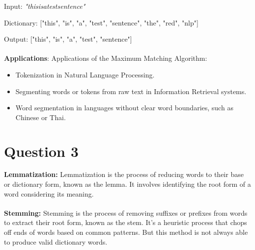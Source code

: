 \documentclass{article}
\begin{document}
Input: \textit{"thisisatestsentence"}

Dictionary: ["this", "is", "a", "test", "sentence", "the", "red", "nlp"]

Output: ["this", "is", "a", "test", "sentence"]\\\\

\textbf{Applications}: Applications of the Maximum Matching Algorithm:
\begin{itemize}
  \item Tokenization in Natural Language Processing.
  \item Segmenting words or tokens from raw text in Information Retrieval systems.
  \item Word segmentation in languages without clear word boundaries, such as Chinese or Thai.
\end{itemize}

\pagebreak

\section{Question 3}
\textbf{Lemmatization:} Lemmatization is the process of reducing words to their base or dictionary form, known as the lemma. It involves identifying the root form of a word considering its meaning. \\\\


\textbf{Stemming:} Stemming is the process of removing suffixes or prefixes from words to extract their root form, known as the stem. It's a heuristic process that chops off ends of words based on common patterns. But this method is not always able to produce valid dictionary words.
\end{document}
